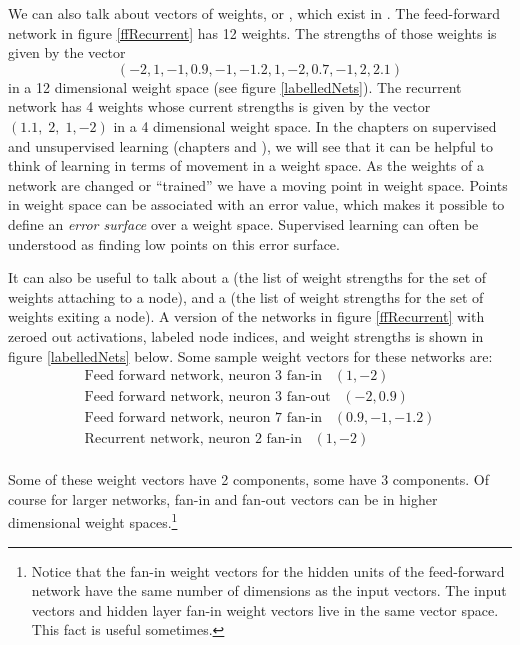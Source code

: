 We can also talk about vectors of weights, or , which exist in . The feed-forward network in figure \ref{ffRecurrent} has 12 weights. The strengths of those weights is given by the vector 
\begin{equation*}
(-2, 1, -1, 0.9, -1, -1.2, 1, -2, 0.7, -1, 2, 2.1)
\end{equation*}
in a 12 dimensional weight space (see figure \ref{labelledNets}). The recurrent network has 4 weights whose current strengths is given by the vector $(1.1,\; 2,\; 1,-2)$ in a 4 dimensional weight space. In the chapters on supervised and unsupervised learning (chapters  and ), we will see that it can be helpful to think of learning in terms of movement in a weight space. As the weights of a network are changed or ``trained'' we have a moving point in weight space. Points in weight space can be associated with an error value, which makes it possible to define an \emph{error surface} over a weight space. Supervised learning can often be understood as finding low points on this error surface.

It can also be useful to talk about a  (the list of weight strengths for the set of weights attaching to a node), and a  (the list of weight strengths for the set of weights exiting a node). A version of the networks in figure \ref{ffRecurrent} with zeroed out activations, labeled node indices, and weight strengths  is shown in figure \ref{labelledNets} below. Some sample weight vectors for these networks are:
\begin{eqnarray*}
\mbox{Feed forward network, neuron 3 fan-in} \;  \;  \;  (1,-2) \\
\mbox{Feed forward network, neuron 3 fan-out} \; \; \; (-2,0.9) \\
\mbox{Feed forward network, neuron 7 fan-in} \; \; \;  (0.9,-1,-1.2) \\
\mbox{Recurrent network, neuron 2 fan-in} \; \; \; (1,-2) \\
\end{eqnarray*}

Some of these weight vectors have 2 components, some have 3 components. Of course for larger networks, fan-in and fan-out vectors can be in higher dimensional weight spaces.\footnote{Notice that the fan-in weight vectors for the hidden units of the feed-forward network have the same number of dimensions as the input vectors. The input vectors and hidden layer fan-in weight vectors live in the same vector space. This fact is useful sometimes.}

